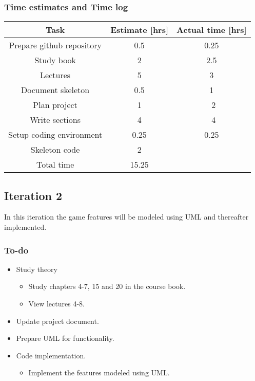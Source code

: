 \documentclass[12pt, letterpaper]{article}
\begin{document}
\subsubsection{Time estimates and Time log}
\begin{center}
	\begin{tabular}{|c|c|c|} 
		\hline
		Task & Estimate [hrs] & Actual time [hrs] \\ [0.5ex] 
		\hline\hline
		Prepare github repository & 0.5 & 0.25\\
		\hline 
		Study book & 2 & 2.5 \\
		\hline
		Lectures & 5 & 3 \\
		\hline 
		Document skeleton & 0.5 & 1 \\
		\hline 
		Plan project & 1 & ~2\\
		\hline
		Write sections & 4 & ~4\\
		\hline 
		Setup coding environment & 0.25 & 0.25\\
		\hline 
		Skeleton code & 2 & \\ 
		\hline
		Total time & 15.25 & \\ [1ex]
		\hline 
	\end{tabular}
\end{center}

\subsection{Iteration 2}
In this iteration the game features will be modeled using UML and thereafter implemented.
\subsubsection{To-do}
\begin{itemize}
	\item Study theory
	\begin{itemize}
		\item Study chapters 4-7, 15 and 20 in the course book.
		\item View lectures 4-8.
	\end{itemize}
	\item Update project document.
	\item Prepare UML for functionality.
	\item Code implementation.
	\begin{itemize}
		\item Implement the features modeled using UML.
	\end{itemize}
\end{itemize}
\end{document}
